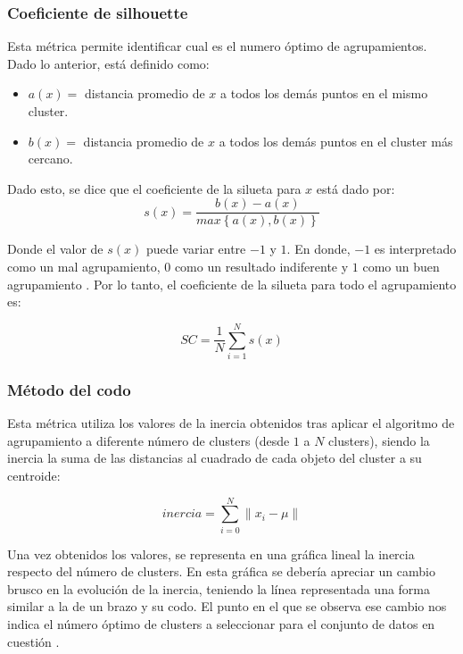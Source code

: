 \subsubsection{Coeficiente de silhouette} 
Esta métrica permite identificar cual es el numero óptimo de agrupamientos. Dado lo anterior, está definido como:
\begin{itemize}[label=]
	\item $a(x)=$ distancia promedio de $x$ a todos los demás puntos en el mismo cluster.
	\item $b(x)=$ distancia promedio de $x$ a todos los demás puntos en el cluster más cercano.
\end{itemize}
Dado esto, se dice que el coeficiente de la silueta para $x$ está dado por:
\begin{equation}
	s(x) = \frac{b(x)-a(x)}{max\left\lbrace a(x), b(x) \right\rbrace }
\end{equation}

Donde el valor de $s(x)$ puede variar entre $-1$ y $1$. En donde, $-1$ es interpretado como un mal agrupamiento, $0$ como un resultado indiferente y $1$ como un buen agrupamiento \cite{Ramirez2018}. Por lo tanto, el coeficiente de la silueta para todo el agrupamiento es:

\begin{equation}
	SC = \frac{1}{N} \sum_{i = 1}^{N}s(x)
\end{equation}
\subsubsection{Método del codo}
Esta métrica utiliza los valores de la inercia obtenidos tras aplicar el algoritmo de agrupamiento a diferente número de clusters (desde $1$ a $N$ clusters), siendo la inercia la suma de las distancias al cuadrado de cada objeto del cluster a su centroide:

\begin{equation}
	inercia = \sum_{i = 0}^{N}  \parallel x_{i} - \mu  \parallel
\end{equation}

Una vez obtenidos los valores, se representa en una gráfica lineal la inercia respecto del número de clusters. En esta gráfica se debería apreciar un cambio brusco en la evolución de la inercia, teniendo la línea representada una forma similar a la de un brazo y su codo. El punto en el que se observa ese cambio nos indica el número óptimo de clusters a seleccionar para el conjunto de datos en cuestión \cite{Moya2022}. 


